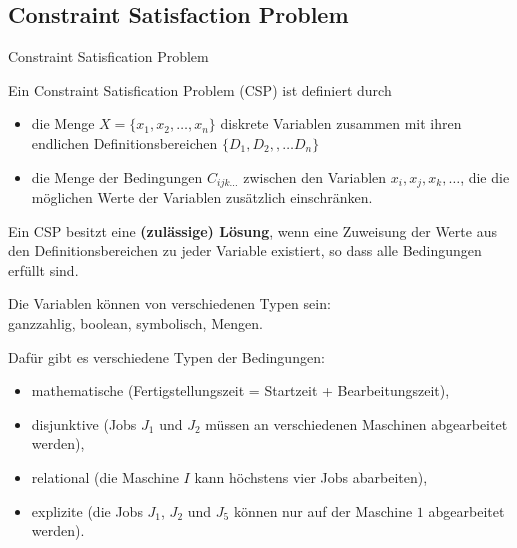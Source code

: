 \documentclass[hyperref={pdfpagelabels=false}]{beamer}
\begin{document}
\subsection{Constraint Satisfaction Problem}
\begin{frame}{Constraint Satisfication Problem}
  \begin{definition}
  Ein {\color{darkred} Constraint Satisfication Problem} ({\color{darkred}CSP}) ist definiert durch\begin{itemize}
	\item  die Menge $X= \{ x_1,x_2,\dots, x_n\}$ diskrete Variablen zusammen mit ihren endlichen Definitionsbereichen $\{ D_1,D_2,,\dots D_n\}$ 
	\item die Menge der Bedingungen $C_{ijk\dots}$ zwischen den Variablen $x_i, x_j, x_k, \dots$, die die möglichen Werte der Variablen zusätzlich einschränken.
  \end{itemize}
  Ein CSP besitzt eine {\bf (zulässige) Lösung}, wenn eine Zuweisung der Werte aus den  Definitionsbereichen zu jeder Variable existiert, so dass alle Bedingungen erfüllt sind.
  \end{definition}
\end{frame}
\begin{frame}
Die Variablen können von verschiedenen Typen sein:\\ ganzzahlig, boolean, symbolisch, Mengen.
\vspace{15pt}

Dafür gibt es verschiedene Typen der Bedingungen:
\begin{itemize}
	\setlength{\itemsep}{0pt}
	\item mathematische (Fertigstellungszeit = Startzeit + Bearbeitungszeit),
	\item disjunktive (Jobs $J_1$ und $J_2$ müssen an verschiedenen Maschinen abgearbeitet werden),
	\item relational (die Maschine $I$ kann höchstens vier Jobs abarbeiten),
	\item explizite (die Jobs $J_1$, $J_2$ und $J_5$ können nur auf der Maschine $1$ abgearbeitet werden).
\end{itemize}
\end{frame}
\end{document}
